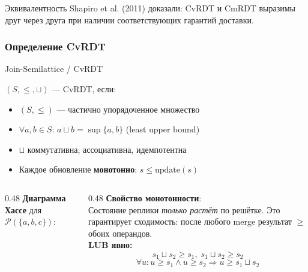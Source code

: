 \documentclass{beamer}
\newenvironment{definitionbox}[1][Определение]{%
  \begin{exampleblock}{#1}
}{%
  \end{exampleblock}
}
\begin{document}
\begin{frame}
\bigskip
\begin{exampleblock}{Эквивалентность}
Shapiro et al. (2011) доказали: CvRDT и CmRDT выразимы друг через друга при наличии соответствующих гарантий доставки.
\end{exampleblock}

\end{frame}

\begin{frame}
\frametitle{Определение CvRDT}

\begin{definitionbox}[Join-Semilattice / CvRDT]
$(S, \leq, \sqcup)$ — CvRDT, если:
\begin{itemize}
  \item $(S, \leq)$ — частично упорядоченное множество
  \item $\forall a,b \in S$: $a \sqcup b = \sup\{a,b\}$ (least upper bound)
  \item $\sqcup$ коммутативна, ассоциативна, идемпотентна
  \item Каждое обновление \textbf{монотонно}: $s \leq \text{update}(s)$
\end{itemize}
\end{definitionbox}

\begin{columns}
\begin{column}{0.48\textwidth}
\textbf{Диаграмма Хассе} для $\mathcal{P}(\{a,b,c\})$:
\end{column}
\begin{column}{0.48\textwidth}
\textbf{Свойство монотонности}:\\[0.3em]
Состояние реплики \emph{только растёт} по решётке. Это гарантирует сходимость: после любого merge результат $\geq$ обоих операндов.\\[0.6em]
\textbf{LUB явно:}
\[
  s_1 \sqcup s_2 \geq s_1,\; s_1 \sqcup s_2 \geq s_2
\]
\[
  \forall u: u\geq s_1 \land u\geq s_2 \Rightarrow u \geq s_1 \sqcup s_2
\]
\end{column}
\end{columns}

\end{frame}
\end{document}
